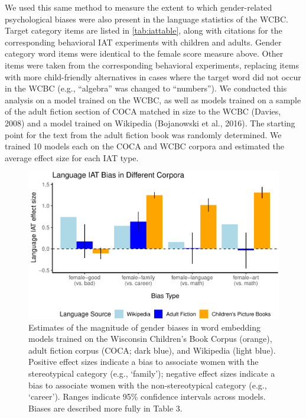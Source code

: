 \documentclass[
  english,
  ,man,floatsintext]{apa6}
\begin{document}
We used this same method to measure the extent to which gender-related psychological biases were also present in the language statistics of the WCBC. Target category items are listed in \autoref{tab:iattable}, along with citations for the corresponding behavioral IAT experiments with children and adults. Gender category word items were identical to the female score measure above. Other items were taken from the corresponding behavioral experiments, replacing items with more child-friendly alternatives in cases where the target word did not occur in the WCBC (e.g., \enquote{algebra} was changed to \enquote{numbers}). We conducted this analysis on a model trained on the WCBC, as well as models trained on a sample of the adult fiction section of COCA matched in size to the WCBC (Davies, 2008) and a model trained on Wikipedia (Bojanowski et al., 2016). The starting point for the text from the adult fiction book was randomly determined. We trained 10 models each on the COCA and WCBC corpora and estimated the average effect size for each IAT type.

\begin{figure}[t!]
\includegraphics[width=\textwidth,]{kidbookgender_psych_sci_files/figure-latex/languageiat-1} \caption{Estimates of the magnitude of gender biases in word embedding models trained on the Wisconsin Children’s Book Corpus (orange), adult fiction corpus (COCA; dark blue), and Wikipedia (light blue). Positive effect sizes indicate a bias to associate women with the stereotypical category (e.g., ‘family'); negative effect sizes indicate a bias to associate women with the non-stereotypical category (e.g., ‘career’).  Ranges indicate 95\% confidence intervals across models. Biases are described more fully in Table 3.}\label{fig:languageiat}
\end{figure}
\end{document}
